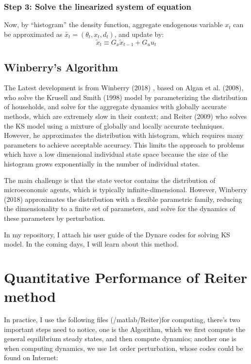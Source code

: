 \subsubsection*{Step 3: Solve the linearized system of equation }
Now, by ``histogram'' the density function, aggregate endogenous variable $x_t$ can be approximated  as $\tilde{x_t} = (\theta_t, x_t, d_t)$, and update by:
\[ \tilde{x}_t \equiv G_x \tilde{x}_{t-1} + G_u u_t\]



\subsection{Winberry's Algorithm}

The Latest development is from Winberry (2018) \cite{winberry2018method}, based on Algan et al. (2008)\cite{algan2008solving}, who solve the Krusell and Smith (1998)\cite{krusell1998income} model by parameterizing the distribution of households, and solve for the aggregate dynamics with globally accurate methods, which are extremely slow in their context; and Reiter (2009)\cite{reiter2009solving} who solves the KS model using a mixture of globally and locally accurate techniques. However, he approximates the distribution with histogram, which requires many parameters to achieve acceptable accuracy. This limits the approach to problems which have a low dimensional individual state space because the size of the histogram grows exponentially in the number of individual states.

The main challenge is that the state vector contains the distribution of microeconomic agents, which is typically infinite-dimensional. However, Winberry (2018) \cite{winberry2018method}approximates the distribution with a flexible parametric family, reducing the dimensionality to a finite set of parameters, and solve for the dynamics of these parameters by perturbation.

In my repository, I attach his user guide of the Dynare codes for solving KS model. In the coming days, I will learn about this method.

\newpage


\section{Quantitative Performance of Reiter method}

In practice, I use the following files (/matlab/Reiter)for computing, there's two important steps need to notice, one is the Algorithm, which we first compute the general equilibrium steady states, and then compute dynamics; another one is when computing dynamics, we use 1st order perturbation, whose codes could be found on Internet: 

